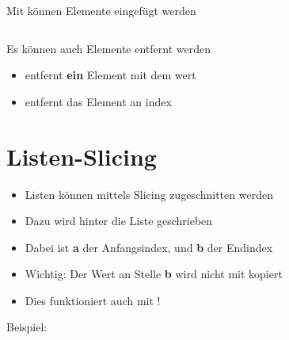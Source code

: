 \begin{frame}
    \slidehead
    Mit  können Elemente eingefügt werden
    \pause
\end{frame}

\begin{frame}
    \slidehead
    \begin{columns}[T]
        \begin{column}[c]{0.5\textwidth}
        \end{column}
        \begin{column}[c]{0.5\textwidth}
        \end{column}
    \end{columns}
\end{frame}

\begin{frame}
    \slidehead
    Es können auch Elemente entfernt werden
    \begin{itemize}[<+->]
       \item {} entfernt \textbf{ein} Element mit dem wert 
        \item {} entfernt das Element an index 
    \end{itemize}
\end{frame}

\livecoding

\section{Listen-Slicing}
\begin{frame}
    \slidehead
    \begin{itemize}
        \item Listen können mittels Slicing zugeschnitten werden
            \pause
        \item Dazu wird  hinter die Liste geschrieben
        \item Dabei ist \textbf{a} der Anfangsindex, und \textbf{b} der Endindex
            \pause
        \item Wichtig: Der Wert an Stelle \textbf{b} wird nicht mit kopiert
        \item Dies funktioniert auch mit !
    \end{itemize}
    \pause

    \begin{block}{Beispiel:}
    \end{block}
\end{frame}

